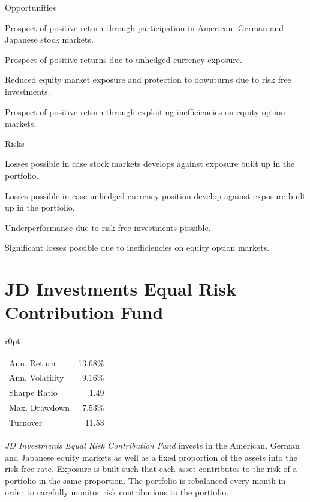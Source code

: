 \documentclass[11pt, parskip=full, DIV=14]{scrreprt}
\begin{document}
\begin{minipage}[t]{0.5\textwidth}
\begin{mybox}{Opportunities}
\begin{sit}
    \item Prospect of positive return through participation in American, German and Japanese stock markets.
    \item Prospect of positive returns due to unhedged currency exposure.
    \item Reduced equity market exposure and protection to downturns due to risk free investments.
    \item Prospect of positive return through exploiting inefficiencies on equity option markets.
\end{sit}
\end{mybox}
\end{minipage}
\begin{minipage}[t]{0.5\textwidth}
  \begin{mybox}{Risks}
  \begin{sit}
    \item Losses possible in case stock markets develops against exposure built up in the portfolio.
    \item Losses possible in case unhedged currency position develop against exposure built up in the portfolio.
    \item Underperformance due to risk free investments possible.
    \item Significant losses possible due to inefficiencies on equity option markets.%
  \end{sit}
  \end{mybox}
\end{minipage}

\newpage\section*{JD Investments Equal Risk Contribution Fund}
\begin{mywraptable}{r}{0pt}
\begin{tabular}{lr}
\toprule
Ann. Return & 13.68\%\\
Ann. Volatility & 9.16\%\\
Sharpe Ratio & 1.49 \\
Max. Drawdown & 7.53\% \\
Turnover & 11.53\\
\bottomrule
\end{tabular}
\end{mywraptable}
\textit{JD Investments Equal Risk Contribution Fund} invests in the American, German and Japanese equity markets as well as a fixed proportion of the assets into the risk free rate.
Exposure is built such that each asset contributes to the risk of a portfolio in the same proportion.
The portfolio is rebalanced every month in order to carefully monitor risk contributions to the portfolio.
\end{document}
